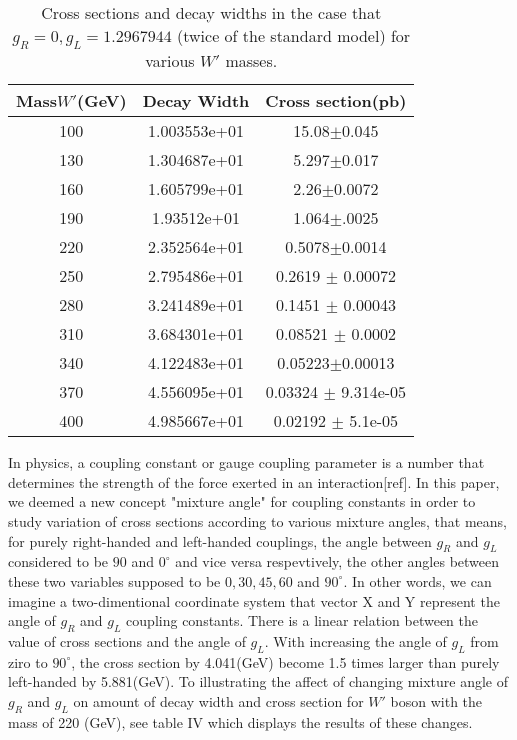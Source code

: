  \begin{table}[htb]
	\centering
\begin{tabular}{|c|c|c|}
\hline 
Mass$ W' $(GeV)  &  Decay Width  &  Cross section(pb)\\
\hline 
100& 1.003553e+01& 15.08$\pm$0.045\\
130 &1.304687e+01& 5.297$\pm$0.017\\
160& 1.605799e+01& 2.26$\pm$0.0072 \\
190&1.93512e+01& 1.064$\pm$.0025\\
220& 2.352564e+01& 0.5078$\pm$0.0014\\
250& 2.795486e+01& 0.2619 $\pm$ 0.00072\\
280& 3.241489e+01& 0.1451 $\pm$ 0.00043\\
310& 3.684301e+01& 0.08521 $\pm$ 0.0002\\
340& 4.122483e+01& 0.05223$\pm$0.00013\\
370& 4.556095e+01&0.03324 $\pm$ 9.314e-05\\
400& 4.985667e+01& 0.02192 $\pm$ 5.1e-05\\ 

\hline
\end{tabular}
\caption{Cross sections and decay widths in the case that $ g_R=0 , g_L=1.2967944  $ (twice of the standard model) for various $W'$ masses. \label{tab1} }
\end{table}
In physics, a coupling constant or gauge coupling parameter is a number that determines the strength of the force exerted in an interaction[ref]. In this paper, we deemed a new concept "mixture angle" for coupling constants in order to study variation of cross sections according to various mixture angles, that means, for purely right-handed and left-handed couplings, the angle between $ g_R$ and  $g_L$ considered to be $ 90 $ and $ 0 ^\circ$ and vice versa respevtively, the other angles between these two variables supposed to be $ 0, 30, 45, 60 $ and $ 90^\circ $. In other words, we can imagine a two-dimentional coordinate system that vector X and Y represent the angle of $ g_R$ and  $g_L$ coupling constants. There is a linear relation between the value of cross sections and the angle of $g_L$. With increasing the angle of $g_L$ from ziro to $ 90 ^\circ$, the cross section by 4.041(GeV) become 1.5 times larger than purely left-handed by 5.881(GeV). To illustrating the affect of changing mixture angle of $ g_R$ and  $g_L$ on amount of decay width and cross section for $ W' $ boson with the mass of 220 (GeV), see table IV which displays the results of these changes.


